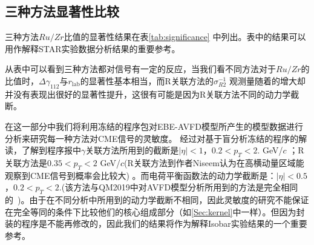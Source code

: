 \subsection{三种方法显著性比较}
三种方法$Ru/Zr$比值的显著性结果在表\ref{tab:significance} 中列出。表中的结果可以用作解释STAR实验数据分析结果的重要参考。

\begin{center}
\begin{table}[tbh]
\centering
\caption{不同方法中 $Ru/Zr$的显著性结果}
\resizebox{0.67\textwidth}{!}{ %
    \begin{tabular}{c|cccccc}
    \toprule
    $n_{5}/s$ & $N_\mathrm{event}$ & $\Delta \gamma_{112} $ &  $\kappa_{112}$ & $r_{\mathrm{lab}}$  & $ \sigma_{R2}^{-1}$ \\
    \hline\noalign{\smallskip}
    0    &   $2\times 10^8 $   &  -1.50  &   -1.21  &  -0.77 & 1.33 \\
    0.05 &    $4\times 10^8 $   &   0.62 &  1.37  &   0.47 & 0.29 \\
    0.10 &    $4\times 10^8 $   &  1.91 &  3.43  &   3.11 & 0.62 \\
    0.20 &     $2\times 10^8 $  & 7.73 &   14.07  &   5.96 & 1.84 \\
    \bottomrule
    \end{tabular}
    }
    \label{tab:significance}
\end{table}
\end{center}


从表中可以看到三种方法都对信号有一定的反应，当我们看不同方法对于$Ru/Zr$的比值时，$\Delta \gamma_{112}$与$r_{\mathrm{lab}}$的显著性基本相当，而R关联方法的$ \sigma_{R2}^{-1}$ 观测量随着\ns 的增大却并没有表现出很好的显著性提升，这很有可能是因为R关联方法不同的动力学截断。

在这一部分中我们将利用冻结的程序包对EBE-AVFD模型所产生的模型数据进行分析来研究每一种方法对CME信号的灵敏度。
经过对基于盲分析冻结的程序的解读，了解到程序报中$\gamma$关联方法所用到的截断是$|\eta|<1$，$0.2 < p_T < 2. $ GeV/$c$ ；R关联方法是$0.35 < p_T < 2$ GeV/$c$(R关联方法到作者Niseem认为在高横动量区域能观察到CME信号到概率会比较大) 。而电荷平衡函数法的动力学截断是：$|\eta|<0.5$，$0.2 < p_T < 2. $(该方法与QM2019中对AVFD模型分析所用到的方法是完全相同的~\cite{Lin2021})。由于在不同分析中所用到的动力学截断不相同，因此灵敏度的研究不能保证在完全等同的条件下比较他们的核心组成部分（如\ref{Sec:kernel}中一样）。但因为封装的程序是不能再修改的，因此我们的结果将作为解释Isobar实验结果的一个重要参考。

